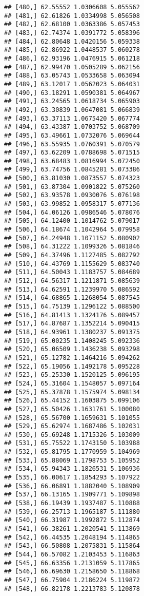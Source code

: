 \documentclass[]{book}
\theoremstyle{definition}
\theoremstyle{definition}
\theoremstyle{definition}
\theoremstyle{remark}
\begin{document}
\begin{verbatim}
## [480,] 62.55552 1.0306608 5.055562
## [481,] 62.61826 1.0334998 5.056508
## [482,] 62.68100 1.0363386 5.057453
## [483,] 62.74374 1.0391772 5.058396
## [484,] 62.80648 1.0420156 5.059338
## [485,] 62.86922 1.0448537 5.060278
## [486,] 62.93196 1.0476915 5.061218
## [487,] 62.99470 1.0505289 5.062156
## [488,] 63.05743 1.0533658 5.063094
## [489,] 63.12017 1.0562023 5.064031
## [490,] 63.18291 1.0590381 5.064967
## [491,] 63.24565 1.0618734 5.065903
## [492,] 63.30839 1.0647081 5.066839
## [493,] 63.37113 1.0675420 5.067774
## [494,] 63.43387 1.0703752 5.068709
## [495,] 63.49661 1.0732076 5.069644
## [496,] 63.55935 1.0760391 5.070579
## [497,] 63.62209 1.0788698 5.071515
## [498,] 63.68483 1.0816994 5.072450
## [499,] 63.74756 1.0845281 5.073386
## [500,] 63.81030 1.0873557 5.074323
## [501,] 63.87304 1.0901822 5.075260
## [502,] 63.93578 1.0930076 5.076198
## [503,] 63.99852 1.0958317 5.077136
## [504,] 64.06126 1.0986546 5.078076
## [505,] 64.12400 1.1014762 5.079017
## [506,] 64.18674 1.1042964 5.079958
## [507,] 64.24948 1.1071152 5.080902
## [508,] 64.31222 1.1099326 5.081846
## [509,] 64.37496 1.1127485 5.082792
## [510,] 64.43769 1.1155629 5.083740
## [511,] 64.50043 1.1183757 5.084689
## [512,] 64.56317 1.1211871 5.085639
## [513,] 64.62591 1.1239970 5.086592
## [514,] 64.68865 1.1268054 5.087545
## [515,] 64.75139 1.1296122 5.088500
## [516,] 64.81413 1.1324176 5.089457
## [517,] 64.87687 1.1352214 5.090415
## [518,] 64.93961 1.1380237 5.091375
## [519,] 65.00235 1.1408245 5.092336
## [520,] 65.06509 1.1436238 5.093298
## [521,] 65.12782 1.1464216 5.094262
## [522,] 65.19056 1.1492178 5.095228
## [523,] 65.25330 1.1520125 5.096195
## [524,] 65.31604 1.1548057 5.097164
## [525,] 65.37878 1.1575974 5.098134
## [526,] 65.44152 1.1603875 5.099106
## [527,] 65.50426 1.1631761 5.100080
## [528,] 65.56700 1.1659631 5.101055
## [529,] 65.62974 1.1687486 5.102031
## [530,] 65.69248 1.1715326 5.103009
## [531,] 65.75522 1.1743150 5.103988
## [532,] 65.81795 1.1770959 5.104969
## [533,] 65.88069 1.1798753 5.105952
## [534,] 65.94343 1.1826531 5.106936
## [535,] 66.00617 1.1854293 5.107922
## [536,] 66.06891 1.1882040 5.108909
## [537,] 66.13165 1.1909771 5.109898
## [538,] 66.19439 1.1937487 5.110888
## [539,] 66.25713 1.1965187 5.111880
## [540,] 66.31987 1.1992872 5.112874
## [541,] 66.38261 1.2020541 5.113869
## [542,] 66.44535 1.2048194 5.114865
## [543,] 66.50808 1.2075831 5.115864
## [544,] 66.57082 1.2103453 5.116863
## [545,] 66.63356 1.2131059 5.117865
## [546,] 66.69630 1.2158650 5.118868
## [547,] 66.75904 1.2186224 5.119872
## [548,] 66.82178 1.2213783 5.120878

\end{verbatim}
\end{document}
